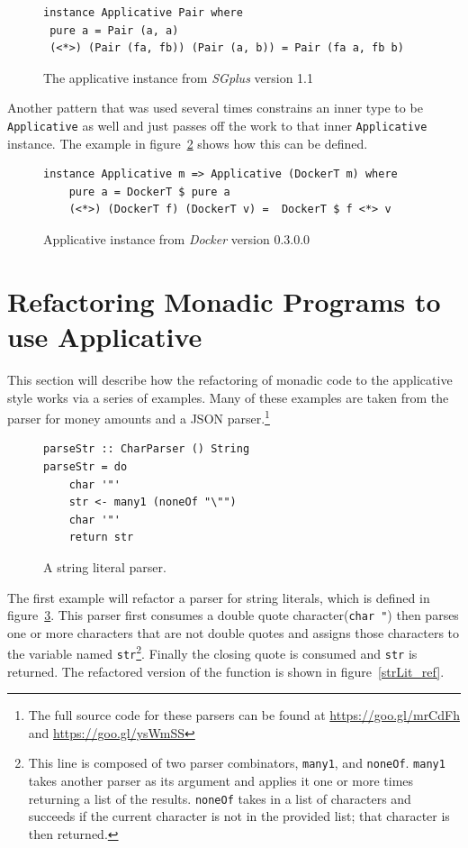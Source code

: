 \begin{figure}[t]
\begin{lstlisting}
instance Applicative Pair where
 pure a = Pair (a, a)
 (<*>) (Pair (fa, fb)) (Pair (a, b)) = Pair (fa a, fb b)
\end{lstlisting}
\caption{The applicative instance from \textit{SGplus} version 1.1}
\label{sgplusPair}
\end{figure}

Another pattern that was used several times constrains an inner type to be \texttt{Applicative} as well and just passes off the work to that inner \texttt{Applicative} instance. The example in figure~\ref{dockerApp} shows how this can be defined.

\begin{figure}[t]
\begin{lstlisting}
instance Applicative m => Applicative (DockerT m) where
    pure a = DockerT $ pure a
    (<*>) (DockerT f) (DockerT v) =  DockerT $ f <*> v
\end{lstlisting}
\caption{Applicative instance from \textit{Docker} version 0.3.0.0}
\label{dockerApp}
\end{figure}

\section{Refactoring Monadic Programs to use Applicative}
\label{sec:appRefact}

This section will describe how the refactoring of monadic code to the applicative style works via a series of examples. Many of these examples are taken from the parser for money amounts and a JSON parser.\footnote{The full source code for these parsers can be found at \url{https://goo.gl/mrCdFh} and \url{https://goo.gl/ysWmSS}} 

\begin{figure}[t]
\begin{lstlisting}
parseStr :: CharParser () String
parseStr = do
	char '"'
	str <- many1 (noneOf "\"")
	char '"'
	return str
\end{lstlisting}
\caption{A string literal parser.}
\label{strLit}
\end{figure}

The first example will refactor a parser for string literals, which is defined in figure~\ref{strLit}. This parser first consumes a double quote character(\texttt{char \textquotesingle"\textquotesingle}) then parses one or more characters that are not double quotes and assigns those characters to the variable named \texttt{str}\footnote{This line is composed of two parser combinators, \texttt{many1}, and \texttt{noneOf}. \texttt{many1} takes another parser as its argument and applies it one or more times returning a list of the results. \texttt{noneOf} takes in a list of characters and succeeds if the current character is not in the provided list; that character is then returned.}. Finally the closing quote is consumed and \texttt{str} is returned. The refactored version of the function is shown in figure~\ref{strLit_ref}.


